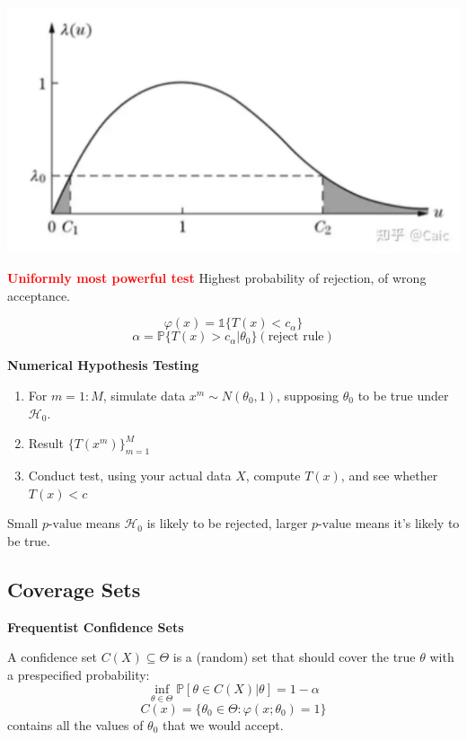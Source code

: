 \documentclass{article}
\begin{document}
\includegraphics[width=\textwidth]{Econometrics-2.pdf}

\begin{note}
  \textbf{\textcolor{red}{Uniformly most powerful test}} Highest probability
  of rejection, of wrong acceptance.
\end{note}

\[ \varphi (x) = \mathbb{1} \{ T (x) < c_{\alpha} \} \]
\[ \alpha = \mathbb{P} \{ T (x) > c_{\alpha} | \theta_0 \} 
   (\text{reject rule}) \]

\textbf{Numerical Hypothesis Testing}

\begin{enumerate}
  \item For $m = 1 : M$, simulate data $x^m \sim N (\theta_0, 1)$, supposing
  $\theta_0$ to be true under $\mathcal{H}_0$.
  
  \item Result $\{ T (x^m) \}_{m = 1}^M$
  
  \item Conduct test, using your actual data $X$, compute $T (x)$, and see
  whether $T (x) < c$
\end{enumerate}

Small $p\text{-value}$ means $\mathcal{H}_0$ is likely to be rejected,
larger $p\text{-value}$ means it's likely to be true.

\subsection{Coverage Sets}

\textbf{Frequentist Confidence Sets}

A confidence set $C (X) \subseteq \Theta$ is a (random) set that should cover
the true $\theta$ with a prespecified probability:
\[ \underset{\theta \in \Theta}{\inf} \mathbb{P} [\theta \in C (X) |
   \theta] = 1 - \alpha \]
\[ C (x) = \{ \theta_0 \in \Theta : \varphi (x ; \theta_0) = 1 \} \]
contains all the values of $\theta_0$ that we would accept.
\end{document}
